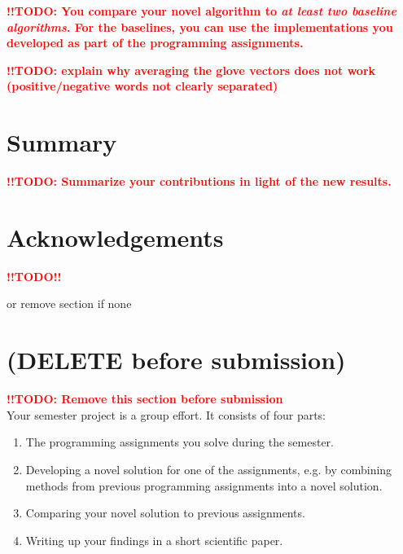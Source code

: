 \documentclass[10pt,conference,compsocconf]{IEEEtran}
\newcommand{\todo}{\textcolor{red}{\textbf{!!TODO!!}}}
\newcommand{\todoThis}[1]{\textcolor{red}{\textbf{!!TODO: #1}}}
\begin{document}
\todoThis{You compare your novel algorithm to \emph{at least two baseline
  algorithms}. For the baselines, you can use the implementations you
developed as part of the programming assignments.\\}

\todoThis{explain why averaging the glove vectors does not work (positive/negative words not clearly separated)}
  
\section{Summary}\label{sec:summary}
\todoThis{Summarize your contributions in light of the new
  results.}

\section*{Acknowledgements}
\todo

or remove section if none



\section{(DELETE before submission)}
\todoThis{Remove this section before submission}\\

Your semester project is a group effort. It consists of four parts:
\begin{enumerate}
\item The programming assignments you solve during the semester.
\item Developing a novel solution for one of the assignments, e.g. by
  combining methods from previous programming assignments into a novel
  solution.
\item Comparing your novel solution to previous assignments.
\item Writing up your findings in a short scientific paper.
\end{enumerate}
\end{document}
